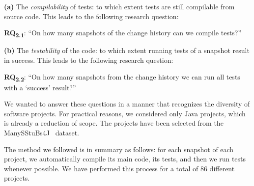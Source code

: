 
\textbf{(a)} The \textit{compilability} of tests: to which extent tests are still compilable from source code. 
This leads to the following research question:

\def \RQI{On how many snapshots of the change history can we compile tests?}

\textbf{RQ\textsubscript{2.1}}: ``\RQI''

\textbf{(b)} The \textit{testability} of the code: to which extent running tests of a snapshot result in success. 
This leads to the following research question:


\def \RQII{On how many snapshots from the change history we can run all tests with a `success' result?}

\textbf{RQ\textsubscript{2.2}}: ``\RQII''


We wanted to answer these questions in a manner that recognizes the diversity of software projects. 
For practical reasons, we considered only Java projects, which is already a reduction of scope. 
The projects have been selected from the ManySStuBs4J~\cite{karampatsis2020often} dataset.

The method we followed is in summary as follows: for each snapshot of each project, we automatically compile its main code, its tests, and then we run tests whenever possible. 
We have performed this process for a total of 86 different projects.

